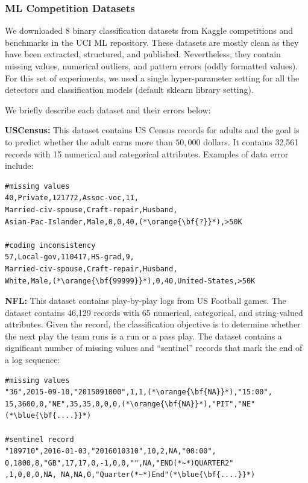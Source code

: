 \subsubsection{ML Competition Datasets}\label{exp:comp}
We downloaded 8 binary classification datasets from Kaggle competitions and benchmarks in the UCI ML repository.   These datasets are mostly clean as they have been extracted, structured, and published.
Nevertheless, they contain missing values, numerical outliers, and pattern errors (oddly formatted values).
For this set of experiments, we used a single hyper-parameter setting for all the detectors and classification models (default \textsf{sklearn} library setting). 

We briefly describe each dataset and their errors below:

\vspace{0.5em}\noindent\textbf{USCensus: } This dataset contains US Census records for adults and the goal is to predict  whether the adult earns more than $50,000$ dollars. It contains 32,561 records with 15 numerical and categorical attributes. Examples of data error include:
\begin{lstlisting}
#missing values
40,Private,121772,Assoc-voc,11,
Married-civ-spouse,Craft-repair,Husband, 
Asian-Pac-Islander,Male,0,0,40,(*\orange{\bf{?}}*),>50K

#coding inconsistency
57,Local-gov,110417,HS-grad,9,
Married-civ-spouse,Craft-repair,Husband,
White,Male,(*\orange{\bf{99999}}*),0,40,United-States,>50K
\end{lstlisting}

\vspace{0.5em}\noindent\textbf{NFL: } This dataset contains play-by-play logs from US Football games. The dataset contains 46,129 records with 65 numerical, categorical, and string-valued attributes. Given the record, the classification objective is to determine whether the next play the team runs is a run or a pass play.
The dataset contains a significant number of missing values and ``sentinel'' records that mark the end of a log sequence:
\begin{lstlisting}
#missing values
"36",2015-09-10,"2015091000",1,1,(*\orange{\bf{NA}}*),"15:00",
15,3600,0,"NE",35,35,0,0,0,(*\orange{\bf{NA}}*),"PIT","NE"(*\blue{\bf{....}}*)

#sentinel record
"189710",2016-01-03,"2016010310",10,2,NA,"00:00",
0,1800,8,"GB",17,17,0,-1,0,0,"",NA,"END(*~*)QUARTER2"
,1,0,0,0,NA, NA,NA,0,"Quarter(*~*)End"(*\blue{\bf{....}}*)
\end{lstlisting}


